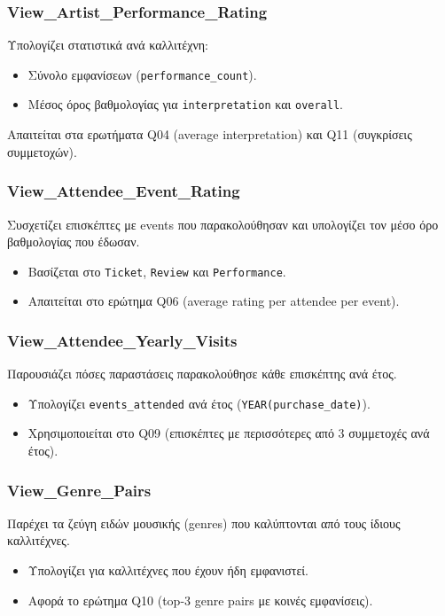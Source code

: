 \documentclass[13pt]{extarticle}
\begin{document}
\subsubsection{View\_Artist\_Performance\_Rating}

Υπολογίζει στατιστικά ανά καλλιτέχνη:
\begin{itemize}
    \item Σύνολο εμφανίσεων (\texttt{performance\_count}).
    \item Μέσος όρος βαθμολογίας για \texttt{interpretation} και \texttt{overall}.
\end{itemize}
Απαιτείται στα ερωτήματα Q04 (average interpretation) και Q11 (συγκρίσεις συμμετοχών).

\subsubsection{View\_Attendee\_Event\_Rating}

Συσχετίζει επισκέπτες με events που παρακολούθησαν και υπολογίζει τον μέσο όρο βαθμολογίας που έδωσαν.
\begin{itemize}
    \item Βασίζεται στο \texttt{Ticket}, \texttt{Review} και \texttt{Performance}.
    \item Απαιτείται στο ερώτημα Q06 (average rating per attendee per event).
\end{itemize}

\subsubsection{View\_Attendee\_Yearly\_Visits}

Παρουσιάζει πόσες παραστάσεις παρακολούθησε κάθε επισκέπτης ανά έτος.
\begin{itemize}
    \item Υπολογίζει \texttt{events\_attended} ανά έτος (\texttt{YEAR(purchase\_date)}).
    \item Χρησιμοποιείται στο Q09 (επισκέπτες με περισσότερες από 3 συμμετοχές ανά έτος).
\end{itemize}

\subsubsection{View\_Genre\_Pairs}

Παρέχει τα ζεύγη ειδών μουσικής (genres) που καλύπτονται από τους ίδιους καλλιτέχνες.
\begin{itemize}
    \item Υπολογίζει για καλλιτέχνες που έχουν ήδη εμφανιστεί.
    \item Αφορά το ερώτημα Q10 (top-3 genre pairs με κοινές εμφανίσεις).
\end{itemize}
\end{document}
